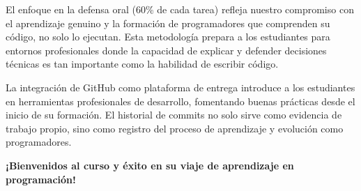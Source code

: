 \documentclass[12pt,letterpaper]{article}
\begin{document}
El enfoque en la defensa oral (60\% de cada tarea) refleja nuestro compromiso con el aprendizaje genuino y la formación de programadores que comprenden su código, no solo lo ejecutan. Esta metodología prepara a los estudiantes para entornos profesionales donde la capacidad de explicar y defender decisiones técnicas es tan importante como la habilidad de escribir código.

La integración de GitHub como plataforma de entrega introduce a los estudiantes en herramientas profesionales de desarrollo, fomentando buenas prácticas desde el inicio de su formación. El historial de commits no solo sirve como evidencia de trabajo propio, sino como registro del proceso de aprendizaje y evolución como programadores.

\vspace{1cm}

\begin{center}
\Large\textcolor{nablabrownmain}{\textbf{¡Bienvenidos al curso y éxito en su viaje de aprendizaje en programación!}}
\end{center}
\end{document}
